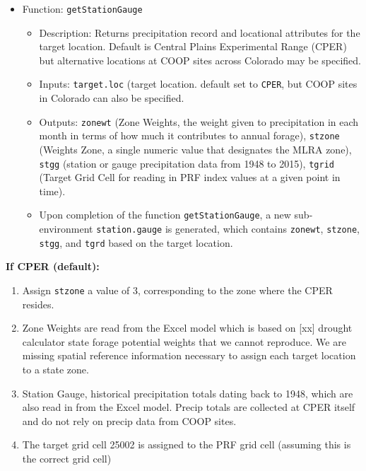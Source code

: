 \documentclass[11pt]{article}
\begin{document}
\begin{itemize}
\item Function: \verb!getStationGauge!
	\begin{itemize}
	\item Description: Returns precipitation record and locational attributes for the target
  location. Default is Central Plains Experimental Range (CPER) but alternative
  locations at COOP sites across Colorado may be specified.
  \item Inputs: \verb!target.loc! (target location. default set to \verb!CPER!, but COOP sites in Colorado can also be specified.
  \item Outputs: \verb!zonewt! (Zone Weights, the weight given to precipitation in each month in terms of how much it contributes to annual forage), \verb!stzone! (Weights Zone, a single numeric value that designates the MLRA zone), \verb!stgg! (station or gauge precipitation data from 1948 to 2015), \verb!tgrid! (Target Grid Cell for reading in PRF index values at a given point in time).
  \item Upon completion of the function \verb!getStationGauge!, a new sub-environment \verb!station.gauge! is generated, which contains \verb!zonewt!, \verb!stzone!, \verb!stgg!, and \verb!tgrd! based on the target location.
	\end{itemize}
\end{itemize}

\textbf{If CPER (default):}
\begin{enumerate}
\item Assign \verb!stzone! a value of 3, corresponding to the zone where the CPER resides.
\item Zone Weights  are read from the Excel model which is based on [xx] drought calculator state forage potential weights that we cannot reproduce. We are missing spatial reference information necessary to assign each target location to a state zone.
\item Station Gauge, historical precipitation totals dating back to 1948, which are also read in from the Excel model. Precip totals are collected at CPER itself and do not rely on precip data from COOP sites.
\item The target grid cell 25002 is assigned to the PRF grid cell (assuming this is the correct grid cell)
\end{enumerate}
\end{document}
